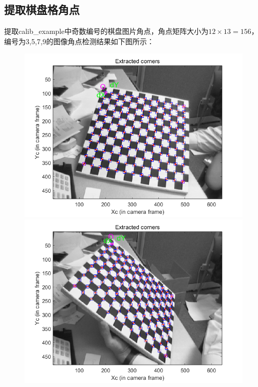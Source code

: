 \documentclass[12pt, a4paper, oneside]{ctexart}
\numberwithin{equation}{section}  %
\begin{document}
\subsection{提取棋盘格角点}
提取calib\_example中奇数编号的棋盘图片角点，角点矩阵大小为$12\times 13 = 156$，编号为3,5,7,9的图像角点检测结果如下图所示：
\begin{figure}[htbp]
    \centering
    \hspace*{-4cm}
    \subfigure
    {
        \begin{minipage}[b]{0.6\linewidth}
            \centering
            \includegraphics[scale=0.6]{角点1.png}
        \end{minipage}
        \begin{minipage}[b]{0.45\linewidth}
            \centering
            \includegraphics[scale=0.6]{角点2.png}

\end{minipage}}
\end{figure}
\end{document}
